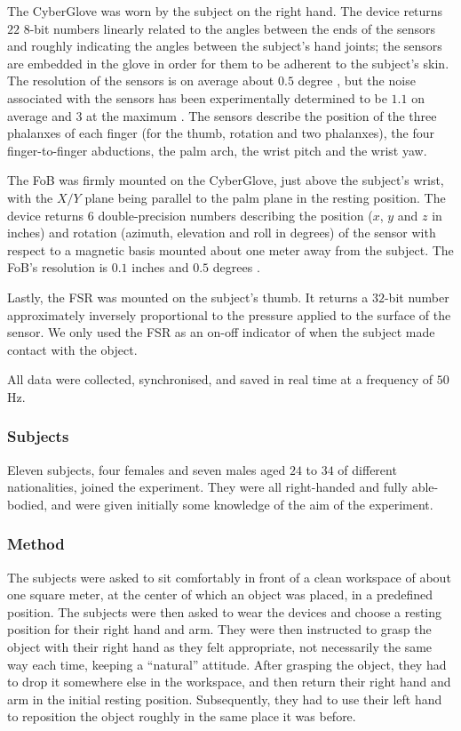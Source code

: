 The CyberGlove was worn by the subject on the right hand. The device
returns $22$ $8$-bit numbers linearly related to the angles between
the ends of the sensors and roughly indicating the angles between the
subject's hand joints; the sensors are embedded in the glove in order
for them to be adherent to the subject's skin. The resolution of the
sensors is on average about $0.5$ degree \cite{cyberglove}, but the
noise associated with the sensors has been experimentally determined
to be $1.1$ on average and $3$ at the maximum \cite{212431}. The
sensors describe the position of the three phalanxes of each finger
(for the thumb, rotation and two phalanxes), the four finger-to-finger
abductions, the palm arch, the wrist pitch and the wrist yaw.

The FoB was firmly mounted on the CyberGlove, just above the subject's
wrist, with the $X/Y$ plane being parallel to the palm plane in the
resting position. The device returns $6$ double-precision numbers
describing the position ($x$, $y$ and $z$ in inches) and rotation
(azimuth, elevation and roll in degrees) of the sensor with respect to
a magnetic basis mounted about one meter away from the subject. The
FoB's resolution is $0.1$ inches and $0.5$ degrees \cite{fob}.

Lastly, the FSR was mounted on the subject's thumb. It returns a
$32$-bit number approximately inversely proportional to the pressure
applied to the surface of the sensor. We only used the FSR as an
on-off indicator of when the subject made contact with the object.

All data were collected, synchronised, and saved in real time at a
frequency of $50$Hz.

\subsubsection*{Subjects}

Eleven subjects, four females and seven males aged $24$ to $34$ of
different nationalities, joined the experiment. They were all
right-handed and fully able-bodied, and were given initially some
knowledge of the aim of the experiment.

\subsubsection*{Method}

The subjects were asked to sit comfortably in front of a clean
workspace of about one square meter, at the center of which an object
was placed, in a predefined position. The subjects were then asked to
wear the devices and choose a resting position for their right hand
and arm. They were then instructed to grasp the object with their
right hand as they felt appropriate, not necessarily the same way each
time, keeping a ``natural'' attitude. After grasping the object, they
had to drop it somewhere else in the workspace, and then return their
right hand and arm in the initial resting position. Subsequently, they
had to use their left hand to reposition the object roughly in the
same place it was before.

